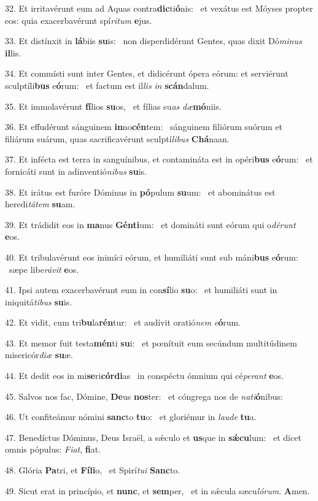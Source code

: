 32. Et irritavérunt eum ad Aquas contra\textbf{dic}ti\textbf{ó}nis: \ast\  et vexátus est Móyses propter eos: quia exacerbavérunt spí\textit{ri}\textit{tum} \textbf{e}jus.\

33. Et distínxit in \textbf{lá}biis \textbf{su}is: \ast\  non disperdidérunt Gentes, quas dixit Dó\textit{mi}\textit{nus} \textbf{il}lis.\

34. Et commísti sunt inter Gentes, et didicérunt ópera eórum: et serviérunt sculptíli\textbf{bus} e\textbf{ó}rum: \ast\  et factum est il\textit{lis} \textit{in} \textbf{scán}dalum.\

35. Et immolavérunt \textbf{fí}lios \textbf{su}os, \ast\  et fílias su\textit{as} \textit{dæ}\textbf{mó}niis.\

36. Et effudérunt sánguinem \textbf{in}no\textbf{cén}tem: \ast\  sánguinem filiórum suórum et filiárum suárum, quas sacrificavérunt sculptí\textit{li}\textit{bus} \textbf{Chá}naan.\

37. Et infécta est terra in sanguínibus, et contamináta est in opéri\textbf{bus} e\textbf{ó}rum: \ast\  et fornicáti sunt in adinventió\textit{ni}\textit{bus} \textbf{su}is.\

38. Et irátus est furóre Dóminus in \textbf{pó}pulum \textbf{su}um: \ast\  et abominátus est heredi\textit{tá}\textit{tem} \textbf{su}am.\

39. Et trádidit eos in \textbf{ma}nus \textbf{Gén}\textbf{ti}um: \ast\  et domináti sunt eórum qui o\textit{dé}\textit{runt} \textbf{e}os.\

40. Et tribulavérunt eos inimíci eórum, et humiliáti sunt sub máni\textbf{bus} e\textbf{ó}rum: \ast\  sæpe libe\textit{rá}\textit{vit} \textbf{e}os.\

41. Ipsi autem exacerbavérunt eum in con\textbf{sí}lio \textbf{su}o: \ast\  et humiliáti sunt in iniquitá\textit{ti}\textit{bus} \textbf{su}is.\

42. Et vidit, cum tri\textbf{bu}la\textbf{rén}tur: \ast\  et audívit oratió\textit{nem} \textit{e}\textbf{ó}rum.\

43. Et memor fuit testa\textbf{mén}ti \textbf{su}i: \ast\  et pœnítuit eum secúndum multitúdinem misericór\textit{di}\textit{æ} \textbf{su}æ.\

44. Et dedit eos in mi\textbf{se}ri\textbf{cór}\textbf{di}as \ast\  in conspéctu ómnium qui cé\textit{pe}\textit{rant} \textbf{e}os.\

45. Salvos nos fac, Dómine, \textbf{De}us \textbf{nos}ter: \ast\  et cóngrega nos de \textit{na}\textit{ti}\textbf{ó}nibus:\

46. Ut confiteámur nómini \textbf{sanc}to \textbf{tu}o: \ast\  et gloriémur in \textit{lau}\textit{de} \textbf{tu}a.\

47. Benedíctus Dóminus, Deus Israël, a sǽculo et \textbf{us}que in \textbf{sǽ}\textbf{cu}lum: \ast\  et dicet omnis pópulus: \textit{Fi}\textit{at}, \textbf{fi}at.\

48. Glória \textbf{Pa}tri, et \textbf{Fí}\textbf{li}o, \ast\  et Spirí\textit{tu}\textit{i} \textbf{Sanc}to.\

49. Sicut erat in princípio, et \textbf{nunc}, et \textbf{sem}per, \ast\  et in sǽcula sæcu\textit{ló}\textit{rum}. \textbf{A}men.\

